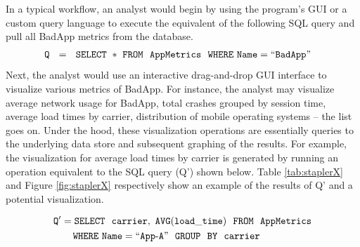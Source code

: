 In a typical workflow, an analyst would begin by using the program's GUI or a custom query language to execute the equivalent
of the following SQL query and pull all BadApp metrics from the database. 
\noindent 
\begin{align*}
& \tt Q \ \ = \ \ SELECT \ * \ FROM \ \  AppMetrics \ \ WHERE  \ Name=``BadApp"
\end{align*}
Next, the analyst would use an interactive drag-and-drop GUI interface to visualize various metrics of BadApp.
For instance, the analyst may visualize average network usage for BadApp, total crashes grouped by session time,
average load times by carrier, distribution of mobile operating systems -- the list goes on.
Under the hood, these visualization operations are essentially queries to the underlying data store and subsequent graphing of 
the results.
For example, the visualization for average load times by carrier is generated by running an operation equivalent to the
SQL query (Q') shown below.
Table \ref{tab:staplerX} and Figure \ref{fig:staplerX} respectively show an example of the results of Q' and a potential
visualization.

\noindent
\begin{align*}
& \tt Q' = SELECT \ \ carrier,\ AVG(load\_time) \ \ FROM \ \  AppMetrics \\
& \tt \hspace{20pt} WHERE\ Name=``App\text{-}A" \ \ GROUP  \ \ BY \ \ carrier
\end{align*}

